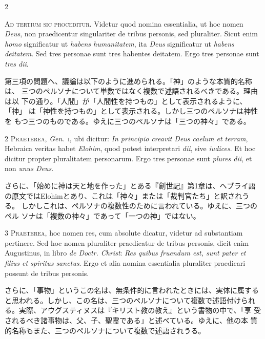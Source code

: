 \documentclass[paper=a4paper,fontsize=10pt,jafontsize=9pt,titlepage]{jlreq}
\begin{document}
\begin{paracol}{2}

{\Huge A}{\scshape d tertium sic proceditur}. Videtur quod nomina essentialia, ut hoc nomen
{\itshape Deus}, non praedicentur singulariter de tribus personis, sed
pluraliter. Sicut enim {\itshape homo} significatur ut {\itshape habens humanitatem}, ita {\itshape Deus}
significatur ut {\itshape habens deitatem}. Sed tres personae sunt tres habentes
deitatem. Ergo tres personae sunt {\itshape tres dii}.

\switchcolumn

第三項の問題へ、議論は以下のように進められる。「神」のような本質的名称は、
 三つのペルソナについて単数ではなく複数で述語されるべきである。理由は以
 下の通り。「人間」が「人間性を持つもの」として表示されるように、「神」
 は「神性を持つもの」として表示される。しかし三つのペルソナは神性を
 もつ三つのものである。ゆえに三つのペルソナは「三つの神々」である。

\switchcolumn*

2 {\scshape Praeterea}, {\itshape Gen}.~{\scshape i}, ubi dicitur: {\itshape In principio creavit Deus caelum et
terram}, Hebraica veritas habet {\itshape Elohim}, quod potest interpretari {\itshape dii},
sive {\itshape iudices}. Et hoc dicitur propter pluralitatem personarum. Ergo tres
personae sunt {\itshape plures dii}, et non {\itshape unus Deus}.

\switchcolumn

さらに、「始めに神は天と地を作った」とある『創世記』第1章は、ヘブライ語
 の原文ではElohimとあり、これは「神々」または「裁判官たち」と訳されうる。
 しかしこれは、ペルソナの複数性のために言われている。ゆえに、三つのペル
 ソナは「複数の神々」であって「一つの神」ではない。

\switchcolumn*

3 {\scshape Praeterea}, hoc nomen res, cum absolute dicatur, videtur ad substantiam
pertinere. Sed hoc nomen pluraliter praedicatur de tribus personis,
dicit enim Augustinus, in libro {\itshape de Doctr. Christ}: {\itshape Res quibus fruendum
est, sunt pater et filius et spiritus sanctus}. Ergo et alia nomina
essentialia pluraliter praedicari possunt de tribus personis.

\switchcolumn

さらに、「事物」というこの名は、無条件的に言われたときには、実体に属する
 と思われる。しかし、この名は、三つのペルソナについて複数で述語付けられ
 る。実際、アウグスティヌスは『キリスト教の教え』という書物の中で、「享
 受されるべき諸事物は、父、子、聖霊である」と述べている。ゆえに、他の本
 質的名称もまた、三つのペルソナについて複数で述語されうる。


\end{paracol}
\end{document}
